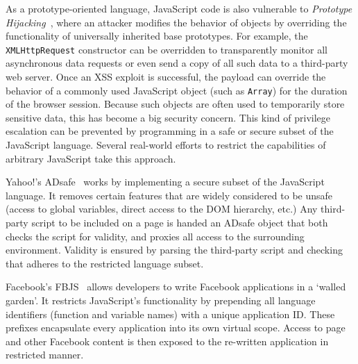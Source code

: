 \documentclass{acmtrans2m}
\begin{document}

As a prototype-oriented language, JavaScript code is also vulnerable to \emph{Prototype Hijacking}~\cite{subvertajax}, where an attacker modifies the behavior of objects by overriding the functionality of universally inherited base prototypes.
For example, the \texttt{XMLHttpRequest} constructor can be overridden to transparently monitor all asynchronous data requests or even send a copy of all such data to a third-party web server.
Once an XSS exploit is successful, the payload can override the behavior of a commonly used JavaScript object (such as \texttt{Array}) for the duration of the browser session.
Because such objects are often used to temporarily store sensitive data, this has become a big security concern.
This kind of privilege escalation can be prevented by programming in a safe or secure subset of the JavaScript language.
Several real-world efforts to restrict the capabilities of arbitrary JavaScript take this approach.

Yahoo!'s ADsafe~\cite{ADsafe} works by implementing a secure subset of the JavaScript language.
It removes certain features that are widely considered to be unsafe (access to global variables, direct access to the DOM hierarchy, etc.) Any third-party script to be included on a page is handed an ADsafe object that both checks the script for validity, and proxies all access to the surrounding environment.
Validity is ensured by parsing the third-party script and checking that adheres to the restricted language subset.

Facebook's FBJS~\cite{fbjs} allows developers to write Facebook applications in a `walled garden'.
It restricts JavaScript's functionality by prepending all language identifiers (function and variable names) with a unique application ID.
These prefixes encapsulate every application into its own virtual scope.
Access to page and other Facebook content is then exposed to the re-written application in restricted manner.
\end{document}

